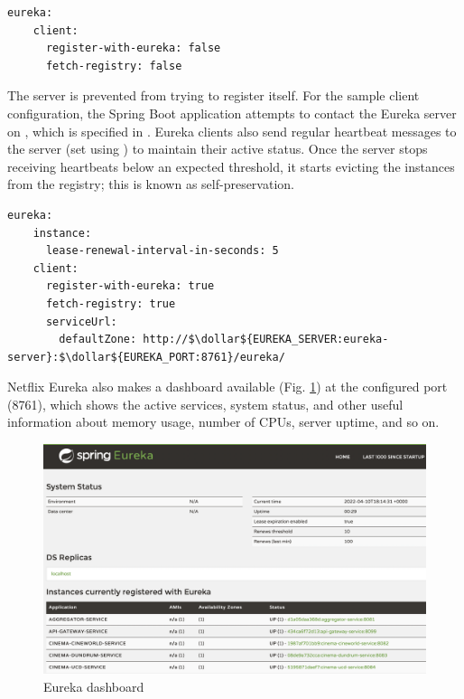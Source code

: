 \begin{lstlisting}[caption=Snippet from Eureka server's application properties]
  eureka:
    client:
      register-with-eureka: false
      fetch-registry: false
\end{lstlisting}

The server is prevented from trying to register itself. For the sample client configuration, the Spring Boot application attempts to contact the Eureka server on , which is specified in . Eureka clients also send regular heartbeat messages to the server (set using ) to maintain their active status. Once the server stops receiving heartbeats below an expected threshold, it starts evicting the instances from the registry; this is known as self-preservation. 

\begin{lstlisting}[caption=Snippet from a Eureka client's application properties]
  eureka:
    instance:
      lease-renewal-interval-in-seconds: 5
    client:
      register-with-eureka: true
      fetch-registry: true
      serviceUrl:
        defaultZone: http://$\dollar${EUREKA_SERVER:eureka-server}:$\dollar${EUREKA_PORT:8761}/eureka/
\end{lstlisting}

Netflix Eureka also makes a dashboard available (Fig. \ref{fig:eureka-dashboard}) at the configured port (8761), which shows the active services, system status, and other useful information about memory usage, number of CPUs, server uptime, and so on.

\begin{figure}[H]
  \centering
  \includegraphics[width=1.0\linewidth]{./assets/images/case-studies/eureka-dashboard.png}
  \caption{Eureka dashboard}
  \label{fig:eureka-dashboard}
\end{figure}

